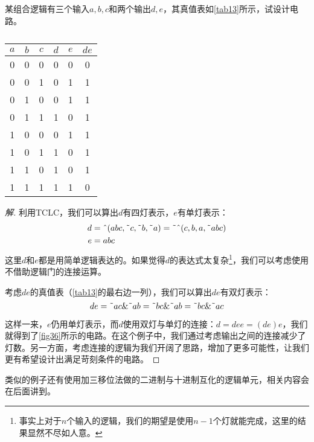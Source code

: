 \begin{example}{}{}\label{exa3}
某组合逻辑有三个输入$a,b,c$和两个输出$d,e$，其真值表如\autoref{tab13}所示，试设计电路。
\begin{table}[H]
\centering
\begin{tabular}{|ccc|cc|c|}
\hline
$a$&$b$&$c$&$d$&$e$&$de$\\\hline
0&0&0&0&0&0\\\hline
0&0&1&0&1&1\\\hline
0&1&0&0&1&1\\\hline
0&1&1&1&0&1\\\hline
1&0&0&0&1&1\\\hline
1&0&1&1&0&1\\\hline
1&1&0&1&0&1\\\hline
1&1&1&1&1&0\\\hline
\end{tabular}
\caption{}\label{tab13}
\end{table}
\begin{proof}[解]
利用TCLC，我们可以算出$d$有四灯表示，$e$有单灯表示：
\begin{align*}
d&=\textnormal{\^{}}(abc,\textnormal{\~{}}c,\textnormal{\~{}}b,\textnormal{\~{}}a)=\textnormal{\~{}}\textnormal{\^{}}(c,b,a,\textnormal{\~{}}abc)\\
e&=abc
\end{align*}
这里$d$和$e$都是用简单逻辑表达的。如果觉得$d$的表达式太复杂\footnote{事实上对于$n$个输入的逻辑，我们的期望是使用$n-1$个灯就能完成，这里的结果显然不尽如人意。}，我们可以考虑使用不借助逻辑门的连接运算。

考虑$de$的真值表（\autoref{tab13}的最右边一列），我们可以算出$de$有双灯表示：
$$de=\textnormal{\~{}}ac\&\textnormal{\~{}}ab=\textnormal{\~{}}bc\&\textnormal{\~{}}ab=\textnormal{\~{}}bc\&\textnormal{\~{}}ac$$

\begin{figure}[H]
\centering
{}%
%
\caption{}\label{fig36}
\end{figure}
	
这样一来，$e$仍用单灯表示，而$d$使用双灯与单灯的连接：$d=dee=(de)e$，我们就得到了\autoref{fig36}所示的电路。在这个例子中，我们通过考虑输出之间的连接减少了灯数。另一方面，考虑连接的逻辑为我们开阔了思路，增加了更多可能性，让我们更有希望设计出满足苛刻条件的电路。
\end{proof}
\end{example}

类似的例子还有使用加三移位法做的二进制与十进制互化的逻辑单元，相关内容会在后面讲到。

